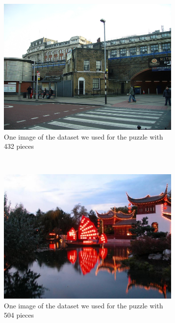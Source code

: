 \documentclass[11pt]{report}
\begin{document}
\begin{figure}
	\centering
	\begin{subfigure}[b]{0.45\textwidth}
		\includegraphics[width=\textwidth]{../imData/432/1.png}
		\caption{One image of the dataset we used for the puzzle with 432 pieces}
		\label{img:432}
	\end{subfigure}
	~
	\begin{subfigure}[b]{0.45\textwidth}
		\includegraphics[width=\textwidth]{../imData/540/1.jpg}
		\caption{One image of the dataset we used for the puzzle with 504 pieces}
		\label{img:540}
	\end{subfigure}
	~
	\begin{subfigure}[b]{0.45\textwidth}

\end{subfigure}
\end{figure}
\end{document}

